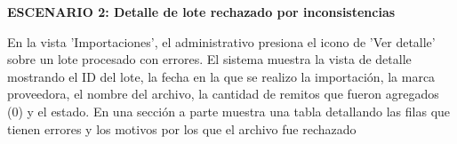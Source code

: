\documentclass[a4paper,9pt]{article}
\begin{document}
\begin{tcolorbox}[hucard, title={\textbf{HU-38: VER DETALLE DE UNA IMPORTACIÓN} \hfill \scriptsize \colorbox{tealstatus}{\textbf{\ Accepted\ }} \quad \colorbox{white}{\textcolor{primarydark}{\textbf{\ 2 pts\ }}}}]
{\noindent\textbf{\textcolor{secondarydark}{ESCENARIO 2:  Detalle de lote rechazado por inconsistencias}}\par\vspace{1pt}
En la vista 'Importaciones', el administrativo presiona el icono de 'Ver detalle' sobre un lote procesado con errores. El sistema muestra la vista de detalle mostrando el ID del lote, la fecha en la que se realizo la importación, la marca proveedora, el nombre del archivo, la cantidad de remitos que fueron agregados (0) y el estado. En una sección a parte muestra una tabla detallando las filas que tienen errores y los motivos por los que el archivo fue rechazado\par\vspace{2.5pt}
}\par
\end{tcolorbox}
\end{document}
